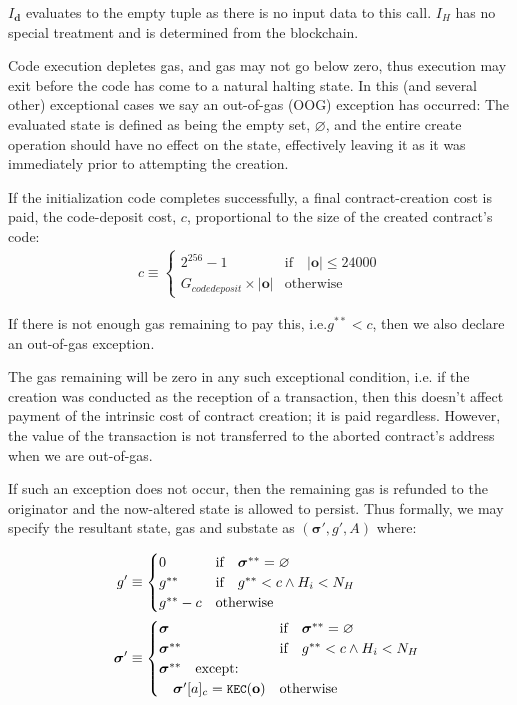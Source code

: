 \documentclass[9pt,oneside]{amsart}
\makeatletter
\newcommand{\firsthomesteadblock}{\ensuremath{N_H}}
\newcommand*\ie{i.e.\@\xspace}
\makeatother
\begin{document}
\begin{multicols}{2}
$I_\mathbf{d}$ evaluates to the empty tuple as there is no input data to this call. $I_H$ has no special treatment and is determined from the blockchain.

Code execution depletes gas, and gas may not go below zero, thus execution may exit before the code has come to a natural halting state. In this (and several other) exceptional cases we say an out-of-gas (OOG) exception has occurred: The evaluated state is defined as being the empty set, $\varnothing$, and the entire create operation should have no effect on the state, effectively leaving it as it was immediately prior to attempting the creation.

If the initialization code completes successfully, a final contract-creation cost is paid, the code-deposit cost, $c$, proportional to the size of the created contract's code:
\begin{align}
c \equiv \begin{cases}
  2^{256} - 1 & \text{if} \quad |\mathbf{o}| \le 24000 \\
  G_{codedeposit} \times |\mathbf{o}| & \text{otherwise}
\end{cases}
\end{align}

If there is not enough gas remaining to pay this, \ie $g^{**} < c$, then we also declare an out-of-gas exception.

The gas remaining will be zero in any such exceptional condition, \ie if the creation was conducted as the reception of a transaction, then this doesn't affect payment of the intrinsic cost of contract creation; it is paid regardless. However, the value of the transaction is not transferred to the aborted contract's address when we are out-of-gas.

If such an exception does not occur, then the remaining gas is refunded to the originator and the now-altered state is allowed to persist. Thus formally, we may specify the resultant state, gas and substate as $(\boldsymbol{\sigma}', g', A)$ where:

\begin{align}
\quad g' &\equiv \begin{cases}
0 & \text{if} \quad \boldsymbol{\sigma}^{**} = \varnothing \\
g^{**} & \text{if} \quad g^{**}<c \wedge H_i<\firsthomesteadblock \\
g^{**} - c & \text{otherwise} \\
\end{cases} \\
\quad \boldsymbol{\sigma}' &\equiv  \begin{cases}
\boldsymbol{\sigma} & \text{if} \quad \boldsymbol{\sigma}^{**} = \varnothing \\
\boldsymbol{\sigma}^{**} & \text{if} \quad g^{**}<c \wedge H_i<\firsthomesteadblock \\
\boldsymbol{\sigma}^{**} \quad \text{except:} & \\
\quad\boldsymbol{\sigma}'[a]_c = \texttt{\small KEC}(\mathbf{o}) & \text{otherwise}
\end{cases}
\end{align}


\end{multicols}
\end{document}
